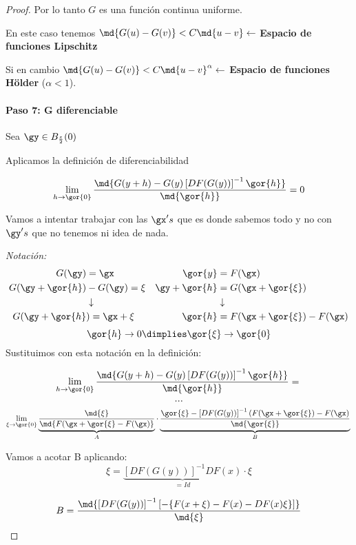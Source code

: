 \begin{proof}
  Por lo tanto $G$ es una función continua uniforme.

  \begin{remark}
  En este caso tenemos $\md{G(u)-G(v)} < C\md{u-v} \leftarrow $ \textbf{Espacio de funciones Lipschitz}

  Si en cambio $\md{G(u)-G(v)} < C\md{u-v}^\alpha \leftarrow $ \textbf{Espacio de funciones Hölder} ($\alpha<1$).
  \end{remark}

  \paragraph{Paso 7: G diferenciable}  Sea $\gy \in B_{\frac{\varepsilon}{2}}(0)$

  Aplicamos la definición de diferenciabilidad

  \[ \lim_{h \rightarrow \gor{0}}\frac{\md{G(y+h) - G(y) \left[DF(G(y))\right]^{-1} \gor{h}}}{\md{\gor{h}}} = 0 \]

  Vamos a intentar trabajar con las $\gx's$ que es donde sabemos todo y no con $\gy's$ que no tenemos ni idea de nada.

  \emph{Notación:}
  \begin{align*}
G(\gy) &= \gx & \gor{y} &= F(\gx)\\
G(\gy + \gor{h}) &- G(\gy) = \xi & \gy + \gor{h} &= G(\gx + \gor{\xi})\\
&\downarrow&\ &\downarrow\\
G(\gy + \gor{h}&) = \gx + \xi & \gor{h} &= F(\gx + \gor{\xi}) - F(\gx)
\end{align*}
$$\gor{h} \rightarrow 0 \dimplies \gor{\xi} \rightarrow \gor{0}$$
  Sustituimos con esta notación en la definición:


  $$\lim_{h \rightarrow \gor{0}}\frac{\md{G(y+h) - G(y) \left[DF(G(y))\right]^{-1} \gor{h}}}{\md{\gor{h}}} = \\$$
  $$...\\$$
  $$\lim_{\xi\rightarrow \gor{0}} \underbrace{\frac{\md{\xi}}{\md{F(\gx + \gor{\xi} - F(\gx)}}}_{A} %
  \cdot \underbrace{\frac{\gor{\xi} - \left[DF(G(y))\right]^{-1} (F(\gx +\gor{\xi}) - F(\gx)}{\md{\gor{\xi}}}}_{B}\\   $$

  Vamos a acotar B aplicando:
  $$\xi = \underbrace{\left[DF(G(y))\right]^{-1}DF(x)}_{=Id} \cdot \xi$$

  $$B = \frac{\md{\left[DF(G(y))\right]^{-1} \left[ -\{F(x+\xi)-F(x) - DF(x)\xi\}\right]}}{\md{\xi}}$$


\end{proof}
